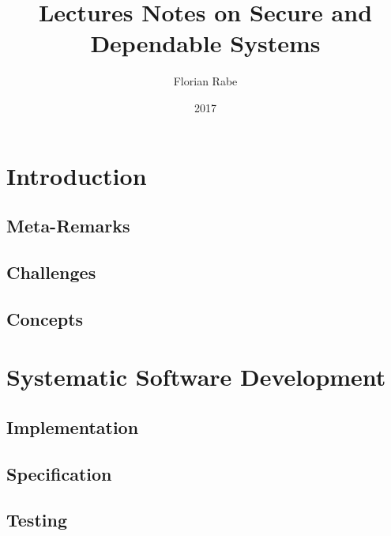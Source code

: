\documentclass{book}
\title{Lectures Notes on Secure and Dependable Systems}
\author{Florian Rabe}
\date{2017}
\begin{document}
\maketitle

\tableofcontents
\newpage

\part{Introduction}

 \chapter{Meta-Remarks}
  

 \chapter{Challenges}
   

  \chapter{Concepts}
   

\part{Systematic Software Development}

  \chapter{Implementation}
    
        
  \chapter{Specification}
    

  \chapter{Testing}
    
\end{document}
